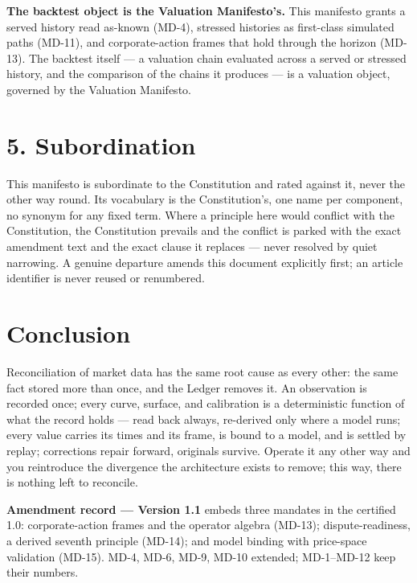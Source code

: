 \documentclass[11pt,a4paper]{article}
\begin{document}
\textbf{The backtest object is the Valuation Manifesto's.} This manifesto grants
a served history read as-known (MD-4), stressed histories as first-class
simulated paths (MD-11), and corporate-action frames that hold through the
horizon (MD-13). The backtest itself --- a valuation chain evaluated across a
served or stressed history, and the comparison of the chains it produces --- is a
valuation object, governed by the Valuation Manifesto.

\section{5. Subordination}

This manifesto is subordinate to the Constitution and rated against it,
never the other way round. Its vocabulary is the Constitution's, one name
per component, no synonym for any fixed term. Where a principle here would
conflict with the Constitution, the Constitution prevails and the
conflict is parked with the exact amendment text and the exact clause it
replaces --- never resolved by quiet narrowing. A genuine departure amends
this document explicitly first; an article identifier is never reused or
renumbered.

\section{Conclusion}

Reconciliation of market data has the same root cause as every other: the
same fact stored more than once, and the Ledger removes it. An observation
is recorded once; every curve, surface, and calibration is a deterministic
function of what the record holds --- read back always, re-derived only
where a model runs; every value carries its times and its frame, is bound
to a model, and is settled by replay; corrections repair forward,
originals survive. Operate it any other way and you reintroduce the
divergence the architecture exists to remove; this way, there is nothing
left to reconcile.

\noindent\textbf{Amendment record --- Version 1.1} embeds three mandates
in the certified 1.0: corporate-action frames and the operator algebra
(MD-13); dispute-readiness, a derived seventh principle (MD-14); and model
binding with price-space validation (MD-15). MD-4, MD-6, MD-9, MD-10
extended; MD-1--MD-12 keep their numbers.
\end{document}
